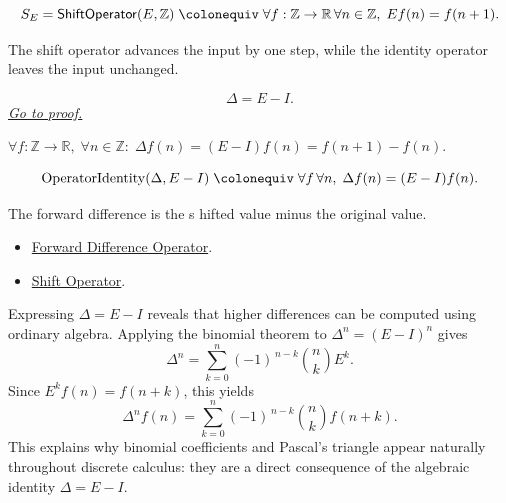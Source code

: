 \begin{remark*}
\[
  S_E=\mathsf{ShiftOperator}(E,\mathbb Z)
  \;\colonequiv\;
  \forall f:\mathbb Z\to\mathbb R\,\forall n\in\mathbb Z,\;
  Ef(n)=f(n+1).
\]
\end{remark*}

\begin{remark*}[Interpretation]
The shift operator advances the input by one step, while the identity
operator leaves the input unchanged.
\end{remark*}

\begin{theorem}[\(\Delta = E - I\)]
\label{thm:delta-shift-minus-identity}
\[
\Delta = E - I.
\]
\hyperref[prf:delta-shift-minus-identity]{\textit{Go to proof.}}
\end{theorem}

\begin{remark*}
\(\forall f : \mathbb{Z}\to\mathbb{R},\; \forall n \in \mathbb{Z}:\;
\Delta f(n) = (E-I)f(n) = f(n+1) - f(n)\).
\end{remark*}

\begin{remark*}
\[
  \operatorname{OperatorIdentity}(\Delta,E-I)
  \;\colonequiv\;
  \forall f\,\forall n,\; \Delta f(n)=(E-I)f(n).
\]
\end{remark*}

\begin{remark*}[Interpretation]
The forward difference is the s
hifted value minus the original value.
\end{remark*}

\begin{dependencies}
\begin{itemize}
  \item \hyperref[def:forward-difference]{Forward Difference Operator}.
  \item \hyperref[def:shift-operator]{Shift Operator}.
\end{itemize}
\end{dependencies}


\begin{exposition}
Expressing \(\Delta = E - I\) reveals that higher differences can be
computed using ordinary algebra. Applying the binomial theorem to
\(\Delta^n = (E-I)^n\) gives
\[
\Delta^n
=
\sum_{k=0}^{n}
(-1)^{\,n-k}
\binom{n}{k}
E^{k}.
\]
Since \(E^k f(n) = f(n+k)\), this yields
\[
\Delta^n f(n)
=
\sum_{k=0}^{n}
(-1)^{\,n-k}
\binom{n}{k}
f(n+k).
\]
This explains why binomial coefficients and Pascal's triangle appear
naturally throughout discrete calculus: they are a direct consequence
of the algebraic identity \(\Delta = E - I\).
\end{exposition}

